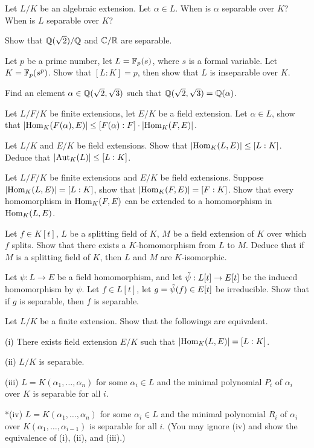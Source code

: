 \begin{question}{18}
    Let $L/K$ be an algebraic extension. Let $\alpha \in L$. When is $\alpha$ separable over $K$? When is $L$ separable over $K$?

    Show that $\mathbb{Q}(\sqrt{2})/\mathbb{Q}$ and $\mathbb{C}/\mathbb{R}$ are separable.

    Let $p$ be a prime number, let $L = \mathbb{F}_p(s)$, where $s$ is a formal variable. Let $K = \mathbb{F}_p(s^p)$. Show that $[L:K] = p$, then show that $L$ is inseparable over $K$.

    Find an element $\alpha \in \mathbb{Q}(\sqrt{2},\sqrt{3})$ such that $\mathbb{Q}(\sqrt{2},\sqrt{3}) = \mathbb{Q}(\alpha)$.
\end{question}

\begin{question}{19}
    Let $L/F/K$ be finite extensions, let $E/K$ be a field extension. Let $\alpha \in L$, show that $|\text{Hom}_K(F(\alpha),E)| \leq [F(\alpha):F] \cdot |\text{Hom}_K(F,E)|$.

    Let $L/K$ and $E/K$ be field extensions. Show that $|\text{Hom}_K(L,E)| \leq [L:K]$. Deduce that $|\text{Aut}_K(L)| \leq [L:K]$.

    Let $L/F/K$ be finite extensions and $E/K$ be field extensions. Suppose $|\text{Hom}_K(L,E)| = [L:K]$, show that $|\text{Hom}_K(F,E)| = [F:K]$. Show that every homomorphism in $\text{Hom}_K(F,E)$ can be extended to a homomorphism in $\text{Hom}_K(L,E)$.
\end{question}   

\begin{question}{19.5}
	Let $f  \in K[t]$, $L$ be a splitting field of $K$, $M$ be a field extension of $K$ over which $f$ splits. Show that there exists a $K$-homomorphism from $L$ to $M$. Deduce that if $M$ is a splitting field of $K$, then $L$ and $M$ are $K$-isomorphic.
\end{question}

\begin{question}{20}
    Let $\psi : L \rightarrow E$ be a field homomorphism, and let $\Tilde{\psi} : L[t] \rightarrow E[t]$ be the induced homomorphism by $\psi$. Let $f \in L[t]$, let $g = \Tilde{\psi}(f) \in E[t]$ be irreducible. Show that if $g$ is separable, then $f$ is separable.

\bigskip

    Let $L/K$ be a finite extension. Show that the followings are equivalent.

    (i) There exists field extension $E/K$ such that $|\text{Hom}_K(L,E)| = [L : K]$.

    (ii) $L/K$ is separable.

    (iii) $L = K(\alpha_1,\dots,\alpha_n)$ for some $\alpha_i \in L$ and the minimal polynomial $P_i$ of $\alpha_i$ over $K$ is separable for all $i$.

    *(iv) $L = K(\alpha_1,\dots,\alpha_n)$ for some $\alpha_i \in L$ and the minimal polynomial $R_i$ of $\alpha_i$ over $K(\alpha_1,\dots,\alpha_{i-1})$ is separable for all $i$. (You may ignore (iv) and show the equivalence of (i), (ii), and (iii).)
\end{question}

